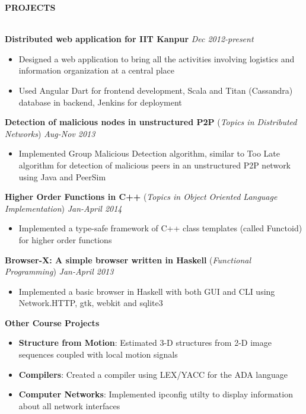 \documentclass[10pt]{article}
\newcommand{\cvsectiontitle}[1]{
    		\colorbox{gray!40}{%
        \begin{minipage}{0.989\linewidth}%
            \vspace*{1pt}%
            \large\indent\textbf{#1}
            \vspace*{1pt}%
        \end{minipage}%
   		}\\[1mm]
		}
\begin{document}
\cvsectiontitle{PROJECTS}
\textbf{Distributed web application for IIT Kanpur} \hfill \textit{Dec 2012-present}
\vspace{-0.2cm}
\begin{itemize}
\setlength{\itemsep}{0.1mm}
	\item Designed a web application to bring all the activities involving logistics and information organization at a central place
	\item Used Angular Dart for frontend development, Scala and Titan (Cassandra) database in backend, Jenkins for deployment
\end{itemize}
\textbf{Detection of malicious nodes in unstructured P2P} (\textit{Topics in Distributed Networks}) \hfill \textit{Aug-Nov 2013}
\vspace{-0.2cm}
\begin{itemize}
	\item Implemented Group Malicious Detection algorithm, similar to Too Late algorithm for detection of malicious peers in an unstructured P2P network using Java and PeerSim
\end{itemize}
\textbf{Higher Order Functions in C++} (\textit{Topics in Object Oriented Language Implementation}) \hfill \textit{Jan-April 2014}
\vspace{-0.2cm}
\begin{itemize}
	\item Implemented a type-safe framework of C++ class templates (called Functoid) for higher order functions
\end{itemize}
\textbf{Browser-X: A simple browser written in Haskell} (\textit{Functional Programming}) \hfill \textit{Jan-April 2013}
\vspace{-0.2cm}
\begin{itemize}
	\item Implemented a basic browser in Haskell with both GUI and CLI using Network.HTTP, gtk, webkit and sqlite3
\end{itemize}
\textbf{Other Course Projects}
\vspace{-0.2cm}
\begin{itemize}
\setlength{\itemsep}{0.1mm}
\item \textbf{Structure from Motion}: Estimated 3-D structures from 2-D image sequences coupled with local motion signals
\item \textbf{Compilers}: Created a compiler using LEX/YACC for the ADA language
\item \textbf{Computer Networks}: Implemented ipconfig utilty to display information about all network interfaces
\end{itemize}
\end{document}
